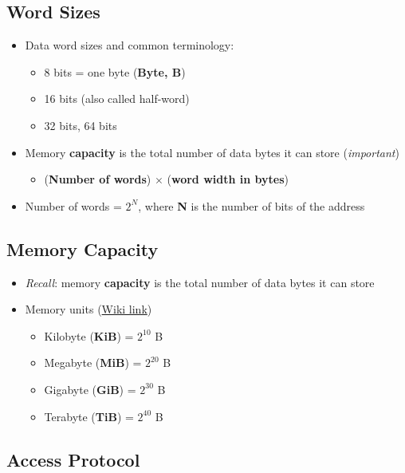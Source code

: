 \documentclass[12pt,openany]{book}
\begin{document}
\subsection{Word Sizes}
    \begin{itemize}
        \item[] Data word sizes and common terminology:
        \begin{itemize}
            \item 8 bits = one byte (\textbf{Byte, B})
            \item 16 bits (also called half-word)
            \item 32 bits, 64 bits
        \end{itemize}
        \item[] Memory \textbf{capacity} is the total number of data bytes it can store (\textit{important})
        \begin{itemize}
            \item (\textbf{Number of words}) $\times$ (\textbf{word width in bytes})
        \end{itemize}
        \item[] Number of words = $2^N$, where \textbf{N} is the number of bits of the address
    \end{itemize}

\subsection{Memory Capacity}	
		\begin{itemize}
			\item[] \textit{Recall}: memory \textbf{capacity} is the total number of data bytes it can store
			\item[] Memory units (\href{https://en.wikipedia.org/wiki/Memory_unit}{Wiki link})
			\begin{itemize}
				\item Kilobyte (\textbf{KiB}) = $2^{10}$ B
				\item Megabyte (\textbf{MiB}) = $2^{20}$ B
				\item Gigabyte (\textbf{GiB}) = $2^{30}$ B
				\item Terabyte (\textbf{TiB}) = $2^{40}$ B
			\end{itemize}
		\end{itemize}

	\subsection{Access Protocol}
\end{document}
